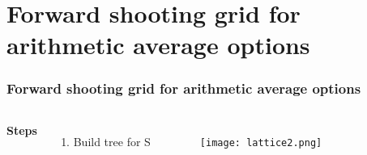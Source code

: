 \documentclass{beamer}
\begin{document}
\section{Forward shooting grid for arithmetic average options} %
\begin{frame}
\frametitle{Forward shooting grid for arithmetic average options}
\begin{columns}[c] %

\textbf{Steps}
\begin{enumerate}
\item Build tree for S
\end{enumerate}

\begin{figure}
	\texttt{[image: lattice2.png]}
\end{figure}

\end{columns}
\end{frame}
\end{document}
